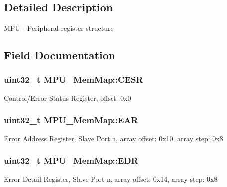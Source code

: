 \subsection{Detailed Description}
M\+P\+U -\/ Peripheral register structure 

\subsection{Field Documentation}
\hypertarget{struct_m_p_u___mem_map_a1cc318bbbdd6c24c5d1ce0df9ebc3c8a}{}
\subsubsection[{C\+E\+S\+R}]{\setlength{\rightskip}{0pt plus 5cm}uint32\+\_\+t M\+P\+U\+\_\+\+Mem\+Map\+::\+C\+E\+S\+R}\label{struct_m_p_u___mem_map_a1cc318bbbdd6c24c5d1ce0df9ebc3c8a}
Control/\+Error Status Register, offset\+: 0x0 \hypertarget{struct_m_p_u___mem_map_af28c58a8a9b1388f572207a9fcb3cad6}{}
\subsubsection[{E\+A\+R}]{\setlength{\rightskip}{0pt plus 5cm}uint32\+\_\+t M\+P\+U\+\_\+\+Mem\+Map\+::\+E\+A\+R}\label{struct_m_p_u___mem_map_af28c58a8a9b1388f572207a9fcb3cad6}
Error Address Register, Slave Port n, array offset\+: 0x10, array step\+: 0x8 \hypertarget{struct_m_p_u___mem_map_aada7844acbf37325b398320ad59b2049}{}
\subsubsection[{E\+D\+R}]{\setlength{\rightskip}{0pt plus 5cm}uint32\+\_\+t M\+P\+U\+\_\+\+Mem\+Map\+::\+E\+D\+R}\label{struct_m_p_u___mem_map_aada7844acbf37325b398320ad59b2049}
Error Detail Register, Slave Port n, array offset\+: 0x14, array step\+: 0x8 \hypertarget{struct_m_p_u___mem_map_a7f9c813f610ff2ffa2027cec351b0b1f}{}
